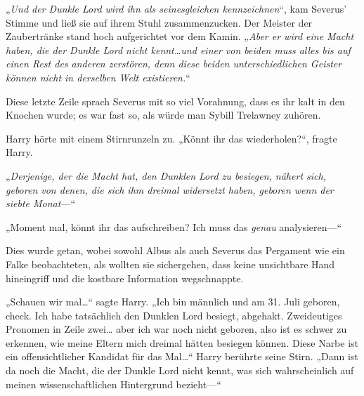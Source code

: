 „\emph{Und der Dunkle Lord wird ihn als seinesgleichen kennzeichnen}“, kam Severus' Stimme und ließ sie auf ihrem Stuhl zusammenzucken. Der Meister der Zaubertränke stand hoch aufgerichtet vor dem Kamin. „\emph{Aber er wird eine Macht haben, die der Dunkle Lord nicht kennt…und einer von beiden muss alles bis auf einen Rest des anderen zerstören, denn diese beiden unterschiedlichen Geister können nicht in derselben Welt existieren.}“

Diese letzte Zeile sprach Severus mit so viel Vorahnung, dass es ihr kalt in den Knochen wurde; es war fast so, als würde man Sybill Trelawney zuhören.

Harry hörte mit einem Stirnrunzeln zu. „Könnt ihr das wiederholen?“, fragte Harry.

„\emph{Derjenige, der die Macht hat, den Dunklen Lord zu besiegen, nähert sich, geboren von denen, die sich ihm dreimal widersetzt haben, geboren wenn der siebte Monat}—“

„Moment mal, könnt ihr das aufschreiben? Ich muss das \emph{genau} analysieren—“

Dies wurde getan, wobei sowohl Albus als auch Severus das Pergament wie ein Falke beobachteten, als wollten sie sichergehen, dass keine unsichtbare Hand hineingriff und die kostbare Information wegschnappte.

„Schauen wir mal…“ sagte Harry. „Ich bin männlich und am 31. Juli geboren, check. Ich habe tatsächlich den Dunklen Lord besiegt, abgehakt. Zweideutiges Pronomen in Zeile zwei… aber ich war noch nicht geboren, also ist es schwer zu erkennen, wie meine Eltern mich dreimal hätten besiegen können. Diese Narbe ist ein offensichtlicher Kandidat für das Mal…“ Harry berührte seine Stirn. „Dann ist da noch die Macht, die der Dunkle Lord nicht kennt, was sich wahrscheinlich auf meinen wissenschaftlichen Hintergrund bezieht—“

